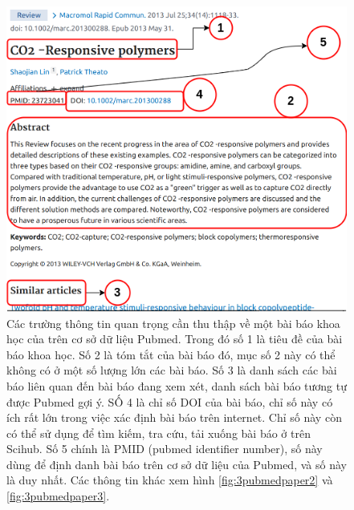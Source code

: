 \documentclass[../DoAn.tex]{subfiles}
\begin{document}
\begin{figure}
\centering
\includegraphics[width=1.0\linewidth]{Hinh_ve/PubmedPaper.png}
\caption{Các trường thông tin quan trọng cần thu thập về một bài báo khoa học của trên cơ sở dữ liệu Pubmed. Trong đó số 1 là tiêu đề của bài báo khoa học. Số 2 là tóm tắt của bài báo đó, mục số 2 này có thể không có ở một số lượng lớn các bài báo. Số 3 là danh sách các bài báo liên quan đến bài báo đang xem xét, danh sách bài báo tương tự được Pubmed gợi ý. SỐ 4 là chỉ số DOI của bài báo, chỉ số này có ích rất lớn trong việc xác định bài báo trên internet. Chỉ số này còn có thể sử dụng để tìm kiếm, tra cứu, tải xuống bài báo ở trên Scihub. Số 5 chính là PMID (pubmed identifier number), số này dùng để định danh bài báo trên cơ sở dữ liệu của Pubmed, và số này là duy nhất. Các thông tin khác xem hình \ref{fig:3pubmedpaper2} và \ref{fig:3pubmedpaper3}. }
\label{fig:3pubmedpaper}
\end{figure}
\end{document}
